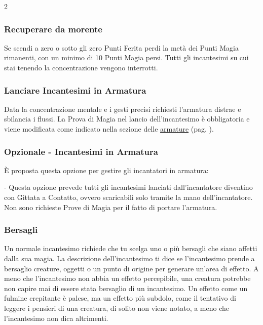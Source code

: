 \begin{multicols}{2}
\subsubsection{Recuperare da morente}\label{magieessereucciso}

Se scendi a zero o sotto gli zero Punti Ferita perdi la metà dei Punti Magia rimanenti, con un minimo di 10 Punti Magia persi. Tutti gli incantesimi su cui stai tenendo la concentrazione vengono interrotti.

\subsubsection{Lanciare Incantesimi in Armatura}\label{magielanciareincantesimiinarmatura}

Data la concentrazione mentale e i gesti precisi richiesti l'armatura distrae e sbilancia i flussi. La Prova di Magia nel lancio dell'incantesimo è obbligatoria e viene modificata come indicato nella sezione delle \hyperlink{armatureemagie}{armature} (pag. \pageref{armatureemagie}).

\subsubsection{Opzionale - Incantesimi in Armatura}

È proposta questa opzione per gestire gli incantatori in armatura:

- Questa opzione prevede tutti gli incantesimi lanciati dall'incantatore diventino con Gittata a Contatto, ovvero scaricabili solo tramite la mano dell'incantatore. Non sono richieste Prove di Magia per il fatto di portare l'armatura.


\subsubsection{Bersagli}\label{magiebersagli}

Un normale incantesimo richiede che tu scelga uno o più bersagli che siano affetti dalla sua magia. La descrizione dell'incantesimo ti dice se l'incantesimo prende a bersaglio creature, oggetti o un punto di origine per generare un'area di effetto. A meno che l'incantesimo non abbia un effetto percepibile, una creatura potrebbe non capire mai di essere stata bersaglio di un incantesimo. Un effetto come un fulmine crepitante è palese, ma un effetto più subdolo, come il tentativo di leggere i pensieri di una creatura, di solito non viene notato, a meno che l'incantesimo non dica altrimenti.


\end{multicols}
